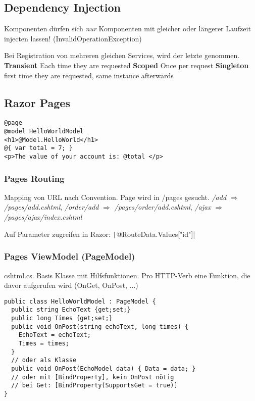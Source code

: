 \begin{multicols*}{2}
\subsection{Dependency Injection}
Komponenten dürfen sich \textit{nur} Komponenten mit gleicher oder längerer Laufzeit injecten lassen! (InvalidOperationException)

Bei Registration von mehreren gleichen Services, wird der letzte genommen.
\textbf{Transient} Each time they are requested \textbf{Scoped} Once per request \textbf{Singleton} first time they are requested, same instance afterwards

\subsection{Razor Pages}
\begin{verbatim}
@page
@model HelloWorldModel
<h1>@Model.HelloWorld</h1>
@{ var total = 7; }
<p>The value of your account is: @total </p>
\end{verbatim}

\subsubsection{Pages Routing}
Mapping von URL nach Convention. Page wird in /pages gesucht.
\textit{/add} \(\Rightarrow\) \textit{/pages/add.cshtml}, \textit{/order/add} \(\Rightarrow\) \textit{/pages/order/add.cshtml}, \textit{/ajax} \(\Rightarrow\) \textit{/pages/ajax/index.cshtml}

Auf Parameter zugreifen in Razor: \texttt|@RouteData.Values["id"]|

\subsubsection{Pages ViewModel (PageModel)}
cshtml.cs. Basis Klasse mit Hilfsfunktionen. Pro HTTP-Verb eine Funktion, die davor aufgerufen wird (OnGet, OnPost, ...)

\begin{verbatim}
public class HelloWorldModel : PageModel {
  public string EchoText {get;set;}
  public long Times {get;set;}
  public void OnPost(string echoText, long times) {
    EchoText = echoText;
    Times = times;
  }
  // oder als Klasse
  public void OnPost(EchoModel data) { Data = data; }
  // oder mit [BindProperty], kein OnPost nötig
  // bei Get: [BindProperty(SupportsGet = true)]
}
\end{verbatim}


\end{multicols*}
